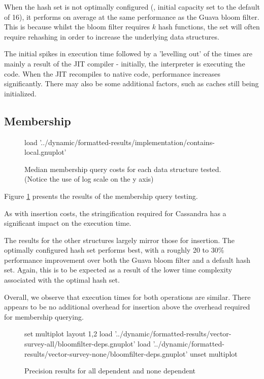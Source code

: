	When the hash set is not optimally configured (\ie, initial capacity set to the default of 16), it performs on average at the same performance as the Guava bloom filter. This is because whilst the bloom filter requires $k$ hash functions, the set will often require rehashing in order to increase the underlying data structures.
	
	The initial spikes in execution time followed by a 'levelling out' of the times are mainly a result of the JIT compiler - initially, the interpreter is executing the code. When the JIT recompiles to native code, performance increases significantly. There may also be some additional factors, such as caches still being initialized.
	
	\subsection{Membership} \label{sec:results/bfimpl/member}
	
	\begin{figure}
		\centering
		\begin{gnuplot}[terminal=pdf]
			load '../dynamic/formatted-results/implementation/contains-local.gnuplot'
		\end{gnuplot}
		\caption{Median membership query costs for each data structure tested. (Notice the use of log scale on the y axis)}
		\label{chart:impl-member}
	\end{figure}
	
	Figure \ref{chart:impl-member} presents the results of the membership query testing.
	
	As with insertion costs, the stringification required for Cassandra has a significant impact on the execution time.
	
	The results for the other structures largely mirror those for insertion. The optimally configured hash set performs best, with a roughly 20 to 30\% performance improvement over both the Guava bloom filter and a default hash set. Again, this is to be expected as a result of the lower time complexity associated with the optimal hash set.
	
	Overall, we observe that execution times for both operations are similar. There appears to be no additional overhead for insertion above the overhead required for membership querying.
	
	\begin{figure}
		\centering
		\begin{gnuplot}[terminal=pdf]
		set multiplot layout 1,2
			load '../dynamic/formatted-results/vector-survey-all/bloomfilter-deps.gnuplot'
			load '../dynamic/formatted-results/vector-survey-none/bloomfilter-deps.gnuplot'
		unset multiplot
		\end{gnuplot}
		\caption{Precision results for all dependent and none dependent}
		\label{chart:precision-all}
	\end{figure}
	

